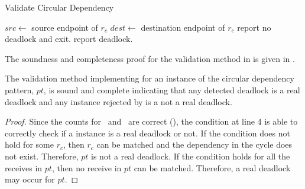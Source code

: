 \begin{algorithm}
\caption{Validate Circular Dependency}\label{algo:vcircular}
\begin{algorithmic}[1]
\State $\mathit{src} \gets$ source endpoint of $\mathit{r_c}$ 
\State $\mathit{dest} \gets$ destination endpoint of $\mathit{r_c}$
\State report no deadlock and exit.
\EndIf
\EndFor
\State report deadlock.
\end{algorithmic}
\end{algorithm}



The soundness and completeness proof for the validation method in  is given in .

\begin{lemma}
The validation method implementing  for an instance of the circular dependency pattern, $\mathit{pt}$, is sound and complete indicating that any detected deadlock is a real deadlock and any instance rejected by  is a not a real deadlock. 
\label{lemma:circular}
\end{lemma}
\begin{proof}
Since the counts for \epsnd\ and \eprcv\ are correct (), the condition at line 4 is able to correctly check if a instance is a real deadlock or not. If the condition does not hold for some $r_c$, then $r_c$ can be matched and the dependency in the cycle does not exist. Therefore, $\mathit{pt}$ is not a real deadlock. If the condition holds for all the receives in $\mathit{pt}$, then no receive in $\mathit{pt}$ can be matched. Therefore, a real deadlock may occur for $\mathit{pt}$.
\end{proof} 





